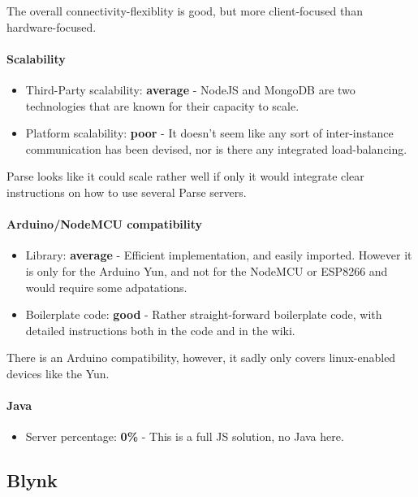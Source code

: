 \documentclass{article}
\begin{document}
The overall connectivity-flexiblity is good, but more client-focused than hardware-focused.

\paragraph{Scalability}

\begin{itemize}
\item Third-Party scalability: \textbf{average} - NodeJS and MongoDB are two technologies that are known for their capacity to scale.
\item Platform scalability: \textbf{poor} - It doesn't seem like any sort of inter-instance communication has been devised, nor is there any integrated load-balancing.
\end{itemize}

Parse looks like it could scale rather well if only it would integrate clear instructions on how to use several Parse servers.

\paragraph{Arduino/NodeMCU compatibility}

\begin{itemize}
\item Library: \textbf{average} - Efficient implementation, and easily imported. However it is only for the Arduino Yun, and not for the NodeMCU or ESP8266 and would require some adpatations.
\item Boilerplate code: \textbf{good} - Rather straight-forward boilerplate code, with detailed instructions both in the code and in the wiki.
\end{itemize}

There is an Arduino compatibility, however, it sadly only covers linux-enabled devices like the Yun.

\paragraph{Java}

\begin{itemize}
\item Server percentage: \textbf{0\%} - This is a full JS solution, no Java here.
\end{itemize}

\subsection{Blynk}
\end{document}
